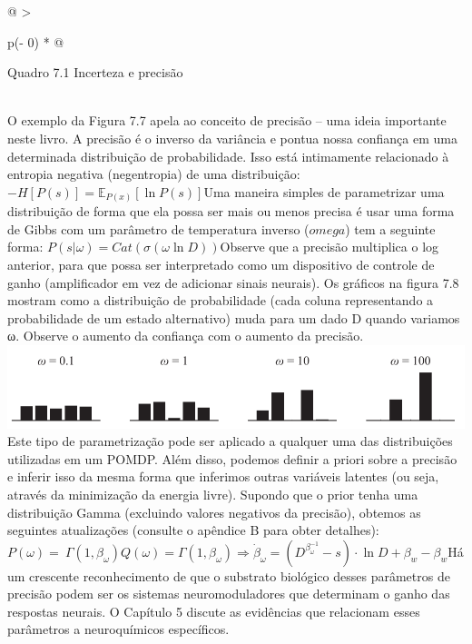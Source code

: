 \documentclass[
  12pt,
]{book}
\begin{document}
\begin{longtable}[]{@{}
  >{\raggedright\arraybackslash}p{(\columnwidth - 0\tabcolsep) * }@{}}
\toprule
\begin{minipage}[b]{\linewidth}\raggedright
Quadro 7.1 Incerteza e precisão
\end{minipage} \\
\midrule
\endhead
O exemplo da Figura 7.7 apela ao conceito de precisão -- uma ideia importante neste livro. A precisão é o inverso da variância e pontua nossa confiança em uma determinada distribuição de probabilidade. Isso está intimamente relacionado à entropia negativa (negentropia) de uma distribuição:\( -H[P(s)]=\mathbb E_{P(x)}[\ln P(s)]\)Uma maneira simples de parametrizar uma distribuição de forma que ela possa ser mais ou menos precisa é usar uma forma de Gibbs com um parâmetro de temperatura inverso (\(omega\)) tem a seguinte forma: \( P(s |\omega )=Cat(\sigma(\omega\ln D))\)Observe que a precisão multiplica o log anterior, para que possa ser interpretado como um dispositivo de controle de ganho (amplificador em vez de adicionar sinais neurais). Os gráficos na figura 7.8 mostram como a distribuição de probabilidade (cada coluna representando a probabilidade de um estado alternativo) muda para um dado D quando variamos ω. Observe o aumento da confiança com o aumento da precisão.\includegraphics{images/Figura_7_8.png}Este tipo de parametrização pode ser aplicado a qualquer uma das distribuições utilizadas em um POMDP. Além disso, podemos definir a priori sobre a precisão e inferir isso da mesma forma que inferimos outras variáveis latentes (ou seja, através da minimização da energia livre). Supondo que o prior tenha uma distribuição Gamma (excluindo valores negativos da precisão), obtemos as seguintes atualizações (consulte o apêndice B para obter detalhes):\(P(\omega)=\ \Gamma(1,\beta_\omega)\)\(Q(\omega)=\Gamma(1,\beta_\omega)\)\(\Longrightarrow\dot\beta_\omega=(D^{\beta_\omega^{-1}}-s)\cdot\ln D+\beta_w-{\beta_w}\)Há um crescente reconhecimento de que o substrato biológico desses parâmetros de precisão podem ser os sistemas neuromoduladores que determinam o ganho das respostas neurais. O Capítulo 5 discute as evidências que relacionam esses parâmetros a neuroquímicos específicos. \\
\bottomrule
\end{longtable}
\end{document}
